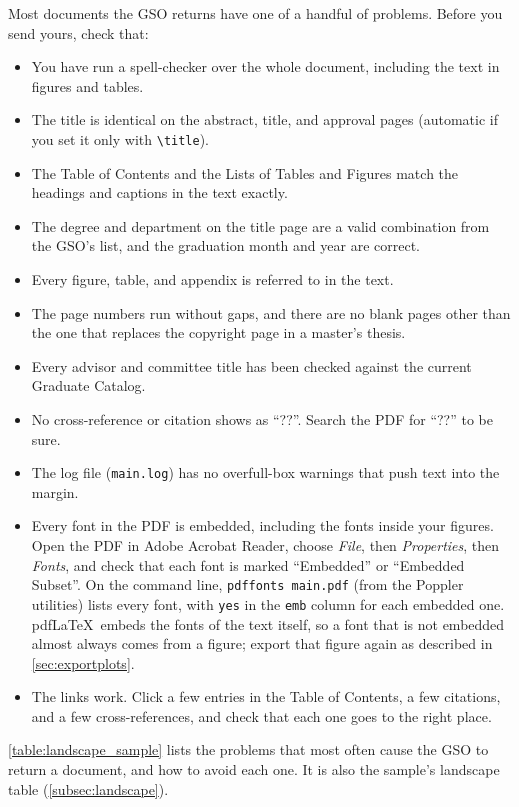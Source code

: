 Most documents the GSO returns have one of a handful of problems. Before you send yours, check that:
\begin{itemize}
\item You have run a spell-checker over the whole document, including the text in figures and tables.
\item The title is identical on the abstract, title, and approval pages (automatic if you set it only with \verb+\title+).
\item The Table of Contents and the Lists of Tables and Figures match the headings and captions in the text exactly.
\item The degree and department on the title page are a valid combination from the GSO's list, and the graduation month and year are correct.
\item Every figure, table, and appendix is referred to in the text.
\item The page numbers run without gaps, and there are no blank pages other than the one that replaces the copyright page in a master's thesis.
\item Every advisor and committee title has been checked against the current Graduate Catalog.
\item No cross-reference or citation shows as ``??''. Search the PDF for ``??'' to be sure.
\item The log file (\texttt{main.log}) has no overfull-box warnings that push text into the margin.
\item Every font in the PDF is embedded, including the fonts inside your figures. Open the PDF in Adobe Acrobat Reader, choose \emph{File}, then \emph{Properties}, then \emph{Fonts}, and check that each font is marked ``Embedded'' or ``Embedded Subset''. On the command line, \verb+pdffonts main.pdf+ (from the Poppler utilities) lists every font, with \texttt{yes} in the \texttt{emb} column for each embedded one. pdf\LaTeX\ embeds the fonts of the text itself, so a font that is not embedded almost always comes from a figure; export that figure again as described in \cref{sec:exportplots}.
\item The links work. Click a few entries in the Table of Contents, a few citations, and a few cross-references, and check that each one goes to the right place.
\end{itemize}

\cref{table:landscape_sample} lists the problems that most often cause the GSO to return a document, and how to avoid each one. It is also the sample's landscape table (\cref{subsec:landscape}).

